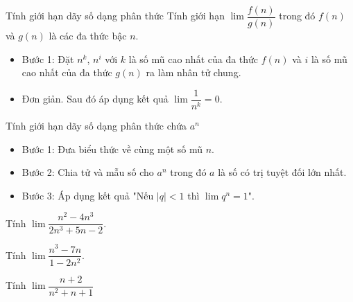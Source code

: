 \begin{dang}{Tính giới hạn dãy số dạng phân thức}
	Tính giới hạn	$\lim \dfrac{f\left(n\right)}{g\left(n\right)}$ trong đó $f\left(n\right)$ và $g\left(n\right)$ là các đa thức bậc $n$.\\
	\begin{itemize}
		\item Bước 1: Đặt $n^k$, $n^i$  với $k$ là số mũ cao nhất của đa thức $f\left(n\right)$ và $i$ là số mũ cao nhất của đa thức $g\left(n\right)$ ra làm nhân tử chung.
		\item Đơn giản. Sau đó áp dụng kết quả 	$\lim \dfrac{1}{n^k}=0$.
	\end{itemize}
\end{dang}
\begin{dang}{Tính giới hạn dãy số dạng phân thức chứa $a^n$}
	\begin{itemize}
		\item Bước 1: Đưa biểu thức về cùng một số mũ $n$.
		\item Bước 2: Chia tử và mẫu số cho $a^n$ trong đó $a$ là số có trị tuyệt đối lớn nhất.
		\item Bước 3: Áp dụng kết quả "Nếu $|q| <1$ thì $\lim q^n =1$".
	\end{itemize}
\end{dang}
\begin{vd}%
	Tính $\lim \dfrac{{{n}^2}-4{{n}^3}}{2{{n}^3}+5n-2}$.
\end{vd}
\begin{vd}%
	Tính $\lim \dfrac{{{n}^3}-7n}{1-2{{n}^2}}$.
\end{vd}
\begin{vd}%
	Tính $\lim \dfrac{n+2}{{{n}^2}+n+1}$
\end{vd}
